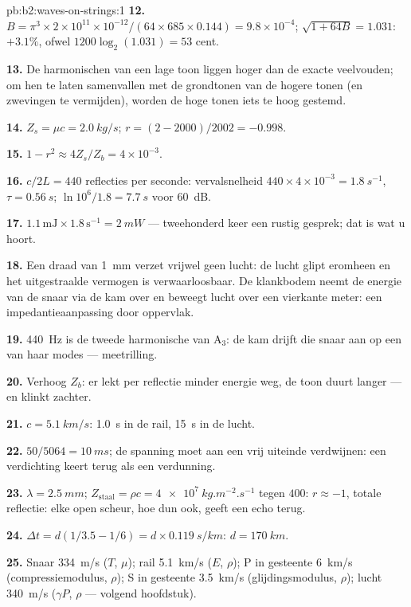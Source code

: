 \begin{solution}{pb:b2:waves-on-strings:1}
\textbf{12.}
$B = \pi^3 \times 2 \times 10^{11} \times 10^{-12}/(64 \times 685 \times 0.144) =
9.8 \times 10^{-4}$;
$\sqrt{1 + 64B} = 1.031$: $+3.1\%$, ofwel $1200\log_2(1.031) = 53$ cent.

\textbf{13.} De harmonischen van een lage toon liggen hoger dan de exacte
veelvouden; om hen te laten samenvallen met de grondtonen van de hogere
tonen (en zwevingen te vermijden), worden de hoge tonen iets te hoog
gestemd.

\textbf{14.} $Z_s = \mu c = \qty{2.0}{kg/s}$; $r = (2 - 2000)/2002 = -0.998$.

\textbf{15.} $1 - r^2 \approx 4Z_s/Z_b = 4 \times 10^{-3}$.

\textbf{16.} $c/2L = 440$ reflecties per seconde: vervalsnelheid
$440 \times 4 \times
10^{-3} = \qty{1.8}{s^{-1}}$, $\tau = \qty{0.56}{s}$;
$\ln10^6/1.8 = \qty{7.7}{s}$ voor \qty{60}{dB}.

\textbf{17.} $1.1\,\text{mJ} \times 1.8\,\text{s}^{-1} = \qty{2}{mW}$ ---
tweehonderd keer een rustig gesprek; dat is wat u hoort.

\textbf{18.} Een draad van \qty{1}{mm} verzet vrijwel geen lucht: de lucht
glipt eromheen en het uitgestraalde vermogen is verwaarloosbaar. De
klankbodem neemt de energie van de snaar via de kam over en beweegt lucht
over een vierkante meter: een impedantieaanpassing door oppervlak.

\textbf{19.} \qty{440}{Hz} is de tweede harmonische van A$_3$: de kam drijft
die snaar aan op een van haar modes --- meetrilling.

\textbf{20.} Verhoog $Z_b$: er lekt per reflectie minder energie weg, de
toon duurt langer --- en klinkt zachter.

\textbf{21.} $c = \qty{5.1}{km/s}$: \qty{1.0}{s} in de rail, \qty{15}{s} in
de lucht.

\textbf{22.} $50/5064 = \qty{10}{ms}$; de spanning moet aan een vrij
uiteinde verdwijnen: een verdichting keert terug als een verdunning.

\textbf{23.} $\lambda = \qty{2.5}{mm}$;
$Z_{\text{staal}} = \rho c = \qty{4e7}{kg.m^{-2}.s^{-1}}$ tegen $400$:
$r \approx -1$, totale reflectie: elke open scheur, hoe dun ook, geeft een
echo terug.

\textbf{24.} $\Delta t = d(1/3.5 - 1/6) = d \times \qty{0.119}{s/km}$:
$d = \qty{170}{km}$.

\textbf{25.} Snaar \qty{334}{m/s} ($T$, $\mu$); rail \qty{5.1}{km/s} ($E$,
$\rho$); P in gesteente \qty{6}{km/s} (compressiemodulus, $\rho$); S in
gesteente \qty{3.5}{km/s} (glijdingsmodulus, $\rho$); lucht \qty{340}{m/s}
($\gamma P$, $\rho$ --- volgend hoofdstuk).
\end{solution}
